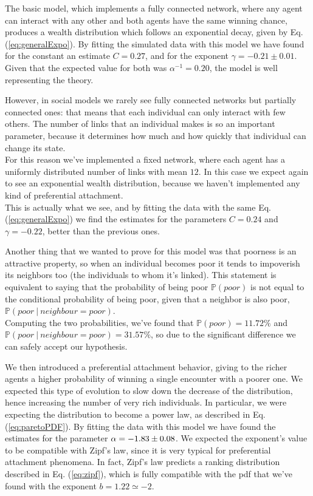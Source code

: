 The basic model, which implements a fully connected network, where any agent can interact with any other and both agents have the same winning chance, produces a wealth distribution which follows an exponential decay, given by Eq. (\ref{eq:generalExpo}).
By fitting the simulated data with this model we have found for the constant an estimate $C = 0.27$, and for the exponent $\gamma = -0.21 \pm 0.01$.
Given that the expected value for both was $\alpha^{-1} = 0.20$, the model is well representing the theory.

However, in social models we rarely see fully connected networks but partially connected ones: that means that each individual can only interact with few others.
The number of links that an individual makes is so an important parameter, because it determines how much and how quickly that individual can change its state. \\
For this reason we've implemented a fixed network, where each agent has a uniformly distributed number of links with mean $12$.
In this case we expect again to see an exponential wealth distribution, because we haven't implemented any kind of preferential attachment. \\
This is actually what we see, and by fitting the data with the same Eq. (\ref{eq:generalExpo}) we find the estimates for the parameters $C = 0.24$ and $\gamma = -0.22$, better than the previous ones.

Another thing that we wanted to prove for this model was that poorness is an attractive property, so when an individual becomes poor it tends to impoverish its neighbors too (the individuals to whom it's linked).
This statement is equivalent to saying that the probability of being poor $\mathbb{P}(poor)$ is not equal to the conditional probability of being poor, given that a neighbor is also poor, $\mathbb{P}(poor \ | \ neighbour=poor)$. \\
Computing the two probabilities, we've found that $\mathbb{P}(poor) = 11.72 \%$ and \\ $\mathbb{P}(poor \ | \ neighbour=poor) = 31.57 \%$, so due to the significant difference we can safely accept our hypothesis.

We then introduced a preferential attachment behavior, giving to the richer agents a higher probability of winning a single encounter with a poorer one.
We expected this type of evolution to slow down the decrease of the distribution, hence increasing the number of very rich individuals.
In particular, we were expecting the distribution to become a power law, as described in Eq. (\ref{eq:paretoPDF}).
By fitting the data with this model we have found the estimates for the parameter $\alpha = -1.83 \pm 0.08$.
We expected the exponent's value to be compatible with Zipf's law, since it is very typical for preferential attachment phenomena.
In fact, Zipf's law predicts a ranking distribution described in Eq. (\ref{eq:zipf}), which is fully compatible with the pdf that we've found with the exponent $b = 1.22 \simeq -2$.

